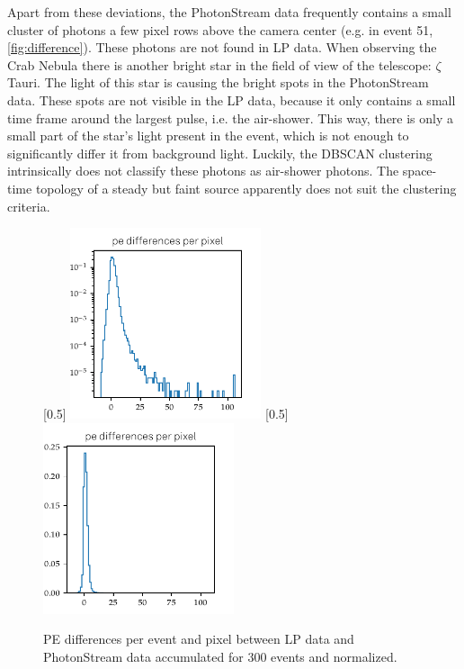 Apart from these deviations, the PhotonStream data frequently contains a small
cluster of photons a few pixel rows above the camera center (e.g. in event 51,
\autoref{fig:difference}). These photons are not found in LP data. When
observing the Crab Nebula there is another bright star in the field of view of
the telescope: $\zeta$ Tauri. The light of this star is causing the bright spots in
the PhotonStream data. These spots are not visible in the LP data, because
it only contains a small time frame around the largest pulse, i.e. the
air-shower. This way, there is only a small part of the star's light present in
the event, which is not enough to significantly differ it from background
light. Luckily, the DBSCAN clustering intrinsically does not classify these
photons as air-shower photons. The space-time topology of a steady but faint
source apparently does not suit the clustering criteria.
%
\begin{figure}
  [0.5\textwidth]{
    \includegraphics[width=0.5\textwidth]{Plots/diffs_hist_DBSCAN_pe_20131104_162_logy.pdf}
  }
  [0.5\textwidth]{
    \includegraphics[width=0.5\textwidth]{Plots/diffs_hist_DBSCAN_pe_20131104_162.pdf}
  }
  \caption{PE differences per event and pixel between LP data and PhotonStream data accumulated for 300 events and normalized.}
\end{figure}
%

